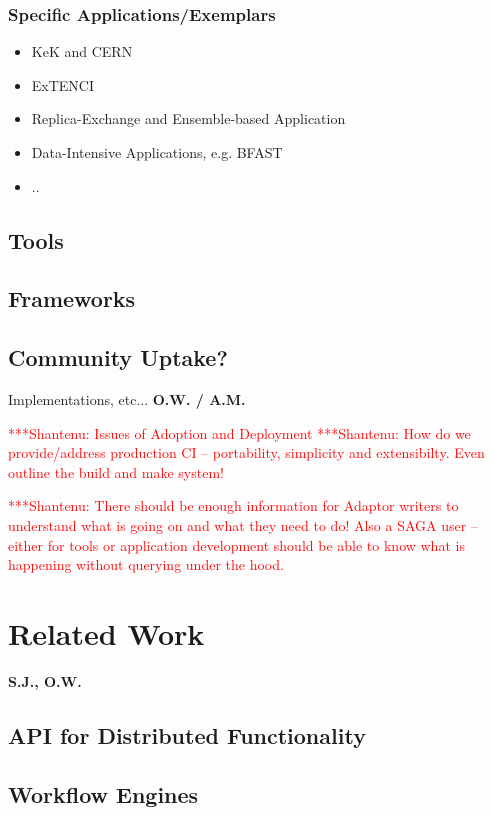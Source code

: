 \documentclass[a4paper,10pt]{article}
\newcommand{\jhanote}[1]{  {\textcolor{red}     { ***Shantenu: #1 }}}
\newcommand{\jhanote}[1]{}
\begin{document}
\subsubsection{Specific Applications/Exemplars}

\begin{itemize}
\item KeK and CERN
\item ExTENCI
\item Replica-Exchange and Ensemble-based Application
\item Data-Intensive Applications, e.g. BFAST
\item .. 
\end{itemize}


 \subsection{Tools}
 \subsection{Frameworks}

 \subsection{Community Uptake?}
 
 Implementations, etc... \textbf{O.W. / A.M.}


 \jhanote{Issues of Adoption and Deployment} \jhanote{How do we
   provide/address production CI -- portability, simplicity and
   extensibilty. Even outline the build and make system!}

 \jhanote{There should be enough information for Adaptor writers to
   understand what is going on and what they need to do! Also a SAGA
   user -- either for tools or application development should be able
   to know what is happening without querying under the hood.}
   


\section{Related Work}
 \textbf{S.J., O.W.}

\subsection{API for Distributed Functionality}

\subsection{Workflow Engines}
\end{document}

